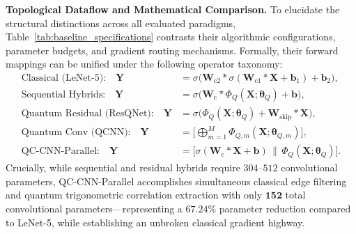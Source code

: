 \documentclass[journal]{IEEEtran}
\begin{document}
\textbf{Topological Dataflow and Mathematical Comparison.} 
To elucidate the structural distinctions across all evaluated paradigms, Table~\ref{tab:baseline_specifications} contrasts their algorithmic configurations, parameter budgets, and gradient routing mechanisms. Formally, their forward mappings can be unified under the following operator taxonomy:
\begin{align}
\text{Classical (LeNet-5):} \quad \mathbf{Y} &= \sigma\Big(\mathbf{W}_{\mathrm{c}2} * \sigma(\mathbf{W}_{\mathrm{c}1} * \mathbf{X} + \mathbf{b}_1) + \mathbf{b}_2\Big), \nonumber \\
\text{Sequential Hybrids:} \quad \mathbf{Y} &= \sigma\Big(\mathbf{W}_{\mathrm{c}} * \Phi_Q(\mathbf{X}; \boldsymbol{\theta}_Q) + \mathbf{b}\Big), \nonumber \\
\text{Quantum Residual (ResQNet):} \quad \mathbf{Y} &= \sigma\Big(\Phi_Q(\mathbf{X}; \boldsymbol{\theta}_Q) + \mathbf{W}_{\mathrm{skip}} * \mathbf{X}\Big), \nonumber \\
\text{Quantum Conv (QCNN):} \quad \mathbf{Y} &= \Big[ \bigoplus_{m=1}^M \Phi_{Q, m}(\mathbf{X}; \boldsymbol{\theta}_{Q, m}) \Big], \nonumber \\
\text{QC-CNN-Parallel:} \quad \mathbf{Y} &= \Big[ \sigma(\mathbf{W}_{\mathrm{c}} * \mathbf{X} + \mathbf{b}) \,\|\, \Phi_Q(\mathbf{X}; \boldsymbol{\theta}_Q) \Big].
\label{eq:architectural_taxonomy_equations}
\end{align}
Crucially, while sequential and residual hybrids require $304$--$512$ convolutional parameters, QC-CNN-Parallel accomplishes simultaneous classical edge filtering and quantum trigonometric correlation extraction with only $\mathbf{152}$ total convolutional parameters---representing a $\mathbf{67.24\%}$ parameter reduction compared to LeNet-5, while establishing an unbroken classical gradient highway.
\end{document}
